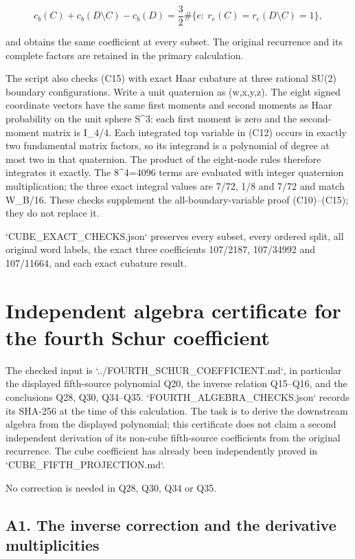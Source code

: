 \documentclass[11pt]{article}
\begin{document}
\[
 c_b(C)+c_b(D\setminus C)-c_b(D)
   =\frac32\#\{e:\ r_e(C)=r_e(D\setminus C)=1\},
\]

and obtains the same coefficient at every subset. The original recurrence and its complete factors are retained in the primary calculation.

The script also checks (C15) with exact Haar cubature at three rational SU(2) boundary configurations. Write a unit quaternion as (w,x,y,z). The eight signed coordinate vectors have the same first moments and second moments as Haar probability on the unit sphere S\textasciicircum{}3: each first moment is zero and the second-moment matrix is I\_4/4. Each integrated top variable in (C12) occurs in exactly two fundamental matrix factors, so its integrand is a polynomial of degree at most two in that quaternion. The product of the eight-node rules therefore integrates it exactly. The 8\textasciicircum{}4=4096 terms are evaluated with integer quaternion multiplication; the three exact integral values are 7/72, 1/8 and 7/72 and match W\_B/16. These checks supplement the all-boundary-variable proof (C10)--(C15); they do not replace it.

`CUBE\_EXACT\_CHECKS.json` preserves every subset, every ordered split, all original word labels, the exact three coefficients 107/2187, 107/34992 and 107/11664, and each exact cubature result.
\clearpage
\section*{Independent algebra certificate for the fourth Schur coefficient}

The checked input is `../FOURTH\_SCHUR\_COEFFICIENT.md`, in particular the displayed fifth-source polynomial Q20, the inverse relation Q15--Q16, and the conclusions Q28, Q30, Q34--Q35. `FOURTH\_ALGEBRA\_CHECKS.json` records its SHA-256 at the time of this calculation. The task is to derive the downstream algebra from the displayed polynomial; this certificate does not claim a second independent derivation of its non-cube fifth-source coefficients from the original recurrence. The cube coefficient has already been independently proved in `CUBE\_FIFTH\_PROJECTION.md`.

No correction is needed in Q28, Q30, Q34 or Q35.

\subsection*{A1. The inverse correction and the derivative multiplicities}
\end{document}
